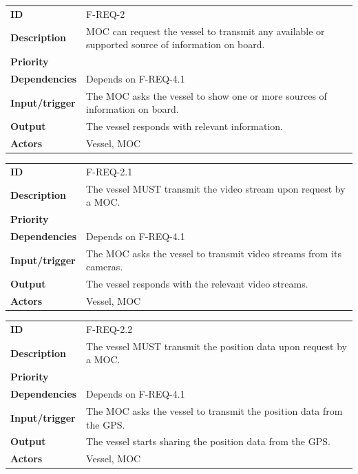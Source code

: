 \begin{table}[H]
	\centering
	\begin{tabularx}{\textwidth}{ l X }
		\rowcolor[HTML]{E7E7E7}
		\textbf{ID} & F-REQ-2 \\
		\textbf{Description} & MOC can request the vessel to transmit any available or supported source of information on board. \\
		\rowcolor[HTML]{E7E7E7}
		\textbf{Priority} & \priohigh \\
		\textbf{Dependencies} & Depends on F-REQ-4.1 \\
		\rowcolor[HTML]{E7E7E7}
		\textbf{Input/trigger} & The MOC asks the vessel to show one or more sources of information on board. \\
		\textbf{Output} & The vessel responds with relevant information. \\
		\rowcolor[HTML]{E7E7E7}
		\textbf{Actors} & Vessel, MOC \\
	\end{tabularx}
	\label{table:f-req-2}
\end{table}

\begin{table}[H]
	\centering
	\begin{tabularx}{\textwidth}{ l X }
		\rowcolor[HTML]{E7E7E7}
		\textbf{ID} & F-REQ-2.1 \\
		\textbf{Description} & The vessel MUST transmit the video stream upon request by a MOC. \\
		\rowcolor[HTML]{E7E7E7}
		\textbf{Priority} & \priohigh \\
		\textbf{Dependencies} & Depends on F-REQ-4.1 \\
		\rowcolor[HTML]{E7E7E7}
		\textbf{Input/trigger} & The MOC asks the vessel to transmit video streams from its cameras. \\
		\textbf{Output} & The vessel responds with the relevant video streams. \\
		\rowcolor[HTML]{E7E7E7}
		\textbf{Actors} & Vessel, MOC \\
	\end{tabularx}
	\label{table:f-req-2.1}
\end{table}

\begin{table}[H]
	\centering
	\begin{tabularx}{\textwidth}{ l X }
		\rowcolor[HTML]{E7E7E7}
		\textbf{ID} & F-REQ-2.2 \\
		\textbf{Description} & The vessel MUST transmit the position data upon request by a MOC. \\
		\rowcolor[HTML]{E7E7E7}
		\textbf{Priority} & \priohigh \\
		\textbf{Dependencies} & Depends on F-REQ-4.1 \\
		\rowcolor[HTML]{E7E7E7}
		\textbf{Input/trigger} & The MOC asks the vessel to transmit the position data from the GPS. \\
		\textbf{Output} & The vessel starts sharing the position data from the GPS. \\
		\rowcolor[HTML]{E7E7E7}
		\textbf{Actors} & Vessel, MOC \\
	\end{tabularx}
	\label{table:f-req-2.2}
\end{table}

